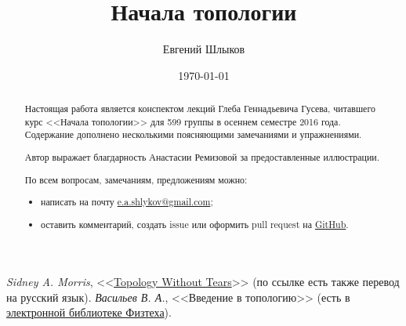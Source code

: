 \documentclass[12pt]{article}
\title{Начала топологии}
\author{Евгений Шлыков}
\affil{Московский физико-технический институт (государственный университет)}
\date{\today}
\theoremstyle{definition}
\theoremstyle{remark}
\theoremstyle{remark}
\theoremstyle{remark}
\theoremstyle{remark}
\begin{document}
\maketitle

\begin{abstract}
	Настоящая работа является конспектом лекций Глеба Геннадьевича Гусева, читавшего курс <<Начала топологии>>
	для 599 группы в осеннем семестре 2016 года. Содержание дополнено несколькими поясняющими замечаниями
	и упражнениями.

	Автор выражает благдарность Анастасии Ремизовой за предоставленные иллюстрации.

	По всем вопросам, замечаниям, предложениям можно:
	\begin{itemize}
		\item написать на почту
			\href{mailto:e.a.shlykov@gmail.com?subject=[diht-topology-notes]}{e.a.shlykov@gmail.com};
		\item оставить комментарий, создать issue или оформить pull request на
			\href{https://github.com/Evgeny-SHL/diht-topology-notes}{GitHub}.
	\end{itemize}
\end{abstract}

\newpage \tableofcontents \newpage

\begin{thebibliography}{9}
	 \textit{Sidney A. Morris}, <<\href{http://www.topologywithouttears.net}{Topology Without Tears}>>
		(по ссылке есть также перевод на русский язык).
	 \textit{Васильев В. А.}, <<Введение в топологию>>
		(есть в \href{http://lib.mipt.ru}{электронной библиотеке Физтеха}).
\end{thebibliography}









\end{document}
